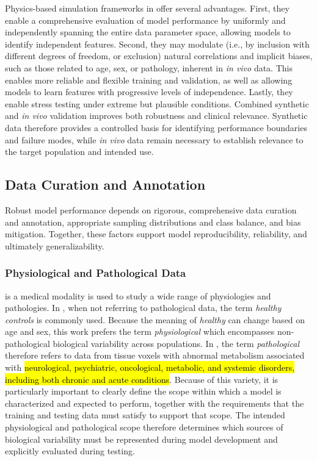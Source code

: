 Physics-based simulation frameworks in \MRS offer several advantages. First, they enable a comprehensive evaluation of \DL model performance by uniformly and independently spanning the entire data parameter space, allowing models to identify independent features. Second, they may modulate (i.e., by inclusion with different degrees of freedom, or exclusion) natural correlations and implicit biases, such as those related to age, sex, or pathology, inherent in \textit{in vivo} data. This enables more reliable and flexible training and validation, as well as allowing models to learn features with progressive levels of independence.  Lastly, they enable stress testing under extreme but plausible conditions. Combined synthetic and \textit{in vivo} validation improves both robustness and clinical relevance. Synthetic data therefore provides a controlled basis for identifying performance boundaries and failure modes, while \textit{in vivo} data remain necessary to establish relevance to the target population and intended use.

\subsection{Data Curation and Annotation}\label{sec:5:subsec:data curation}
Robust \DL model performance depends on rigorous, comprehensive data curation and annotation, appropriate sampling distributions and class balance, and bias mitigation. Together, these factors support model reproducibility, reliability, and ultimately generalizability.

\subsubsection{Physiological and Pathological Data}
\MRS is a medical \MR modality is used to study a wide range of physiologies and pathologies. In \MRS, when not referring to pathological data, the term \textit{healthy controls} is commonly used. Because the meaning of \textit{healthy} can change based on age and sex, this work prefers the term \textit{physiological} which encompasses non-pathological biological variability across populations. In \MRS, the term \textit{pathological} therefore refers to data from tissue voxels with abnormal metabolism associated with \hl{neurological, psychiatric, oncological, metabolic, and systemic disorders, including both chronic and acute conditions}. Because of this variety, it is particularly important to clearly define the scope within which a model is characterized and expected to perform, together with the requirements that the training and testing data must satisfy to support that scope. The intended physiological and pathological scope therefore determines which sources of biological variability must be represented during model development and explicitly evaluated during testing.

